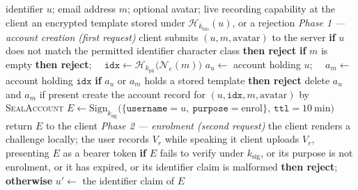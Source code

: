 \documentclass[10pt,journal,compsoc]{IEEEtran}
\begin{document}
{\color{blue}
\begin{algorithm*}[!tbp]
\caption{\textcolor{blue}{User Registration / Enrolment}}\label{alg:register}
\begin{algorithmic}[1]
\Require identifier $u$; email address $m$; optional avatar; live recording capability at the client
\Ensure an encrypted template stored under $\mathcal{H}_{k_{\text{bio}}}(u)$, or a rejection
\Statex \emph{Phase 1 --- account creation (first request)}
\State client submits $(u, m, \text{avatar})$ to the server
\State \textbf{if} $u$ does not match the permitted identifier character class \textbf{then reject}
\State \textbf{if} $m$ is empty \textbf{then reject}; $\quad \texttt{idx} \gets \mathcal{H}_{k_{\text{pii}}}\big(\mathcal{N}_e(m)\big)$ 
\State $a_u \gets$ account holding $u$; $\quad a_m \gets$ account holding $\texttt{idx}$
\State \textbf{if} $a_u$ or $a_m$ holds a stored template \textbf{then reject} 
\State delete $a_u$ and $a_m$ if present 
\State create the account record for $(u, \texttt{idx}, m, \text{avatar})$ by \textsc{SealAccount} 
\State $E \gets \mathrm{Sign}_{k_{\text{sig}}}\big(\{\texttt{username}{=}u,\ \texttt{purpose}{=}\text{enrol}\},\ \texttt{ttl}{=}10\ \text{min}\big)$
\Statex {}
\State return $E$ to the client
\Statex \emph{Phase 2 --- enrolment (second request)}
\State the client renders a challenge locally; the user records $V_r$ while speaking it
\Statex {}
\State client uploads $V_r$, presenting $E$ as a bearer token
\State \textbf{if} $E$ fails to verify under $k_{\text{sig}}$, or its purpose is not enrolment, or it has expired, or its identifier claim is malformed \textbf{then reject}; \textbf{otherwise} $u' \gets$ the identifier claim of $E$
\Statex {}

\end{algorithmic}
\end{algorithm*}}
\end{document}
